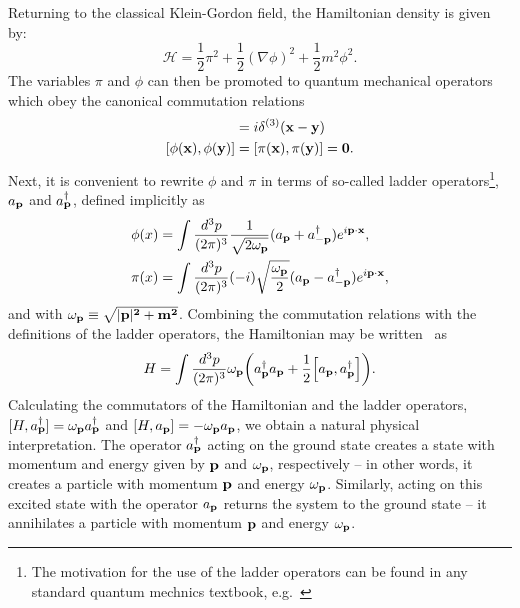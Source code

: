 Returning to the classical Klein-Gordon field, the Hamiltonian density is given by:
\begin{equation} \label{eqn:classical_kg_ham}
    \mathcal H = \frac{1}{2} \pi^2 + \frac{1}{2} (\nabla \phi)^2 + \frac{1}{2} m^2 \phi^2.
\end{equation}
The variables $\pi$ and $\phi$ can then be promoted to quantum mechanical operators which obey the canonical commutation relations
\begin{align}
    [\phi(\bf{x}), \pi(\bf{y})] &= i \delta^{(3)}(\bf{x} - \bf{y}) \\
    [\phi(\bf{x}), \phi(\bf{y})] &= [\pi(\bf{x}), \pi(\bf{y})] = 0.
\end{align}
Next, it is convenient to rewrite $\phi$ and $\pi$ in terms of so-called ladder operators\footnote{The motivation for the use of the ladder operators can be found in any standard quantum mechnics textbook, e.g.~\cite{Griffiths:qm}},  $a_{\bf{p}}$ and $a^{\dagger}_{\bf{p}}$, defined implicitly as
\begin{align}
    \phi(x) &= \int \frac{d^3p}{(2\pi)^3} \frac{1}{\sqrt{2\omega_{\bf{p}}}} (a_{\bf{p}} + a^{\dagger}_{-\bf{p}}) e^{i \bf{p}\cdot\bf{x}}, \\
    \pi(x) &= \int \frac{d^3p}{(2\pi)^3} (-i) \sqrt{\frac{\omega_{\bf{p}}}{2}} (a_{\bf{p}} - a^{\dagger}_{-\bf{p}}) e^{i \bf{p}\cdot\bf{x}},
\end{align}
and with $\omega_{\bf{p}} \equiv \sqrt{|\bf{p}|^2 + m^2}$.
Combining the commutation relations with the definitions of the ladder operators, the Hamiltonian may be written~\cite{Peskin:1995ev} as
\begin{equation}
    H = \int \frac{d^3p}{(2\pi)^3} \omega_{\bf{p}} \bigg( a^{\dagger}_{\bf{p}} a_{\bf{p}} + \frac{1}{2} \Big[a_{\bf{p}}, a^{\dagger}_{\bf{p}} \Big] \bigg).
\end{equation}
Calculating the commutators of the Hamiltonian and the ladder operators, $[H, a^{\dagger}_{\bf{p}}] = \omega_{\bf{p}} a^{\dagger}_{\bf{p}}$ and $[H, a_{\bf{p}}] = -\omega_{\bf{p}} a_{\bf{p}}$, we obtain a natural physical interpretation.
The operator $a^{\dagger}_{\bf{p}}$ acting on the ground state creates a state with momentum and energy given by $\bf{p}$ and $\omega_{\bf{p}}$, respectively -- in other words, it creates a particle with momentum $\bf{p}$ and energy $\omega_{\bf{p}}$.
Similarly, acting on this excited state with the operator $a_{\bf{p}}$ returns the system to the ground state -- it annihilates a particle with momentum $\bf{p}$ and energy $\omega_{\bf{p}}$.

